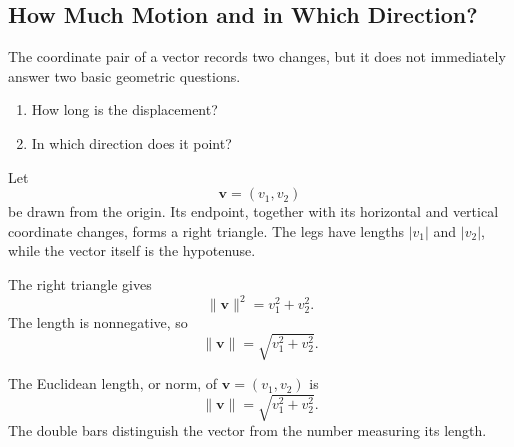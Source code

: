 \subsection{How Much Motion and in Which Direction?}

The coordinate pair of a vector records two changes, but it does not immediately
answer two basic geometric questions.

\begin{corebox}
\begin{enumerate}
    \item How long is the displacement?
    \item In which direction does it point?
\end{enumerate}
\end{corebox}

Let
\[
\mathbf v=(v_1,v_2)
\]
be drawn from the origin. Its endpoint, together with its horizontal and
vertical coordinate changes, forms a right triangle. The legs have lengths
$|v_1|$ and $|v_2|$, while the vector itself is the hypotenuse.

\begin{center}
\end{center}

\begin{derivationbox}
The right triangle gives
\[
\|\mathbf v\|^2=v_1^2+v_2^2.
\]
The length is nonnegative, so
\[
\|\mathbf v\|=\sqrt{v_1^2+v_2^2}.
\]
\end{derivationbox}

\begin{definitionbox}
The Euclidean length, or norm, of $\mathbf v=(v_1,v_2)$ is
\[
\boxed{\|\mathbf v\|=\sqrt{v_1^2+v_2^2}}.
\]
The double bars distinguish the vector from the number measuring its length.
\end{definitionbox}

